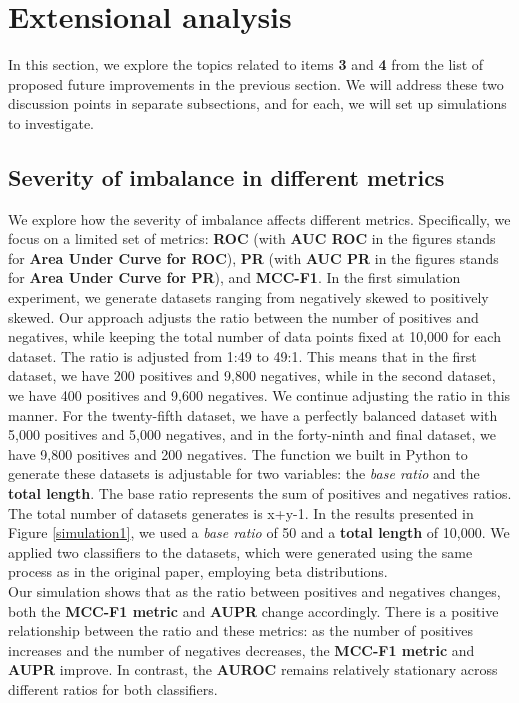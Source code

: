 \documentclass[12pt, oneside]{amsart}
\theoremstyle{definition}
\theoremstyle{remark}
\numberwithin{equation}{section}
\begin{document}
\section{Extensional analysis}
In this section, we explore the topics related to items \textbf{3} and \textbf{4} from the list of proposed future improvements in the previous section. We will address these two discussion points in separate subsections, and for each, we will set up simulations to investigate.

\subsection{Severity of imbalance in different metrics}
We explore how the severity of imbalance affects different metrics. Specifically, we focus on a limited set of metrics: \textbf{ROC} (with \textbf{AUC ROC} in the figures stands for \textbf{Area Under Curve for ROC}), \textbf{PR} (with \textbf{AUC PR} in the figures stands for \textbf{Area Under Curve for PR}), and \textbf{MCC-F1}. In the first simulation experiment, we generate datasets ranging from negatively skewed to positively skewed. Our approach adjusts the ratio between the number of positives and negatives, while keeping the total number of data points fixed at 10,000 for each dataset. The ratio is adjusted from 1:49 to 49:1. This means that in the first dataset, we have 200 positives and 9,800 negatives, while in the second dataset, we have 400 positives and 9,600 negatives. We continue adjusting the ratio in this manner. For the twenty-fifth dataset, we have a perfectly balanced dataset with 5,000 positives and 5,000 negatives, and in the forty-ninth and final dataset, we have 9,800 positives and 200 negatives. The function we built in Python to generate these datasets is adjustable for two variables: the \textit{base ratio} and the \textbf{total length}. The base ratio represents the sum of positives and negatives ratios. The total number of datasets generates is x+y-1. In the results presented in Figure \ref{simulation1}, we used a \textit{base ratio} of 50 and a \textbf{total length} of 10,000. We applied two classifiers to the datasets, which were generated using the same process as in the original paper, employing beta distributions. \\


Our simulation shows that as the ratio between positives and negatives changes, both the \textbf{MCC-F1 metric} and \textbf{AUPR} change accordingly. There is a positive relationship between the ratio and these metrics: as the number of positives increases and the number of negatives decreases, the \textbf{MCC-F1 metric} and \textbf{AUPR} improve. In contrast, the \textbf{AUROC} remains relatively stationary across different ratios for both classifiers.\\
\end{document}
